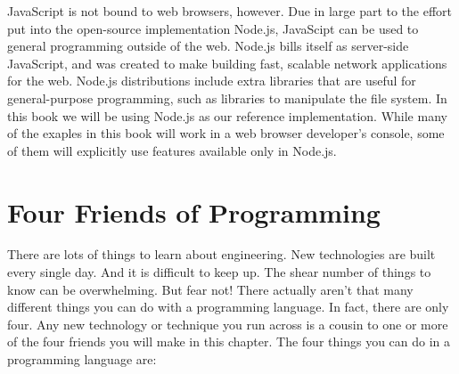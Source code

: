 JavaScript is not bound to web browsers, however. Due in large part to the
effort put into the open-source implementation Node.js,
JavaScipt can be used to general programming outside of the web. Node.js bills
itself as server-side JavaScript, and was created to make building fast,
scalable network applications for the web. Node.js distributions include extra
libraries that are useful for general-purpose programming, such as libraries to
manipulate the file system. In this book we will be using Node.js as our
reference implementation. While many of the exaples in this book will work in a
web browser developer's console, some of them will explicitly use features
available only in Node.js.


\section{Four Friends of Programming}

There are lots of things to learn about engineering. New technologies are built
every single day. And it is difficult to keep up. The shear number of things to
know can be overwhelming. But fear not! There actually aren't that many
different things you can do with a programming language. In fact, there are only
four. Any new technology or technique
you run across is a cousin to one or more of the four friends you will make in
this chapter. The four things you can do in a programming language are:

